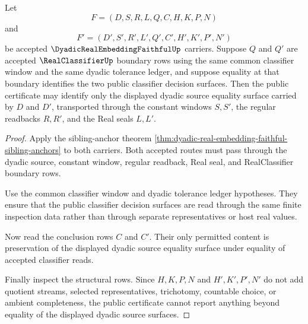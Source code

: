 \begin{theorem}
\label{thm:dyadic-real-embedding-faithful-public-certificate}
Let
$$
F=(D,S,R,L,Q,C,H,K,P,N)
$$
and
$$
F'=(D',S',R',L',Q',C',H',K',P',N')
$$
be accepted $\DyadicRealEmbeddingFaithfulUp$ carriers. Suppose $Q$ and $Q'$ are accepted $\RealClassifierUp$ boundary rows using the same common classifier window and the same dyadic tolerance ledger, and suppose equality at that boundary identifies the two public classifier decision surfaces. Then the public certificate may identify only the displayed dyadic source equality surface carried by $D$ and $D'$, transported through the constant windows $S,S'$, the regular readbacks $R,R'$, and the Real seals $L,L'$.
\end{theorem}
\begin{proof}
Apply the sibling-anchor theorem \autoref{thm:dyadic-real-embedding-faithful-sibling-anchors} to both carriers. Both accepted routes must pass through the dyadic source, constant window, regular readback, Real seal, and RealClassifier boundary rows.

Use the common classifier window and dyadic tolerance ledger hypotheses. They ensure that the public classifier decision surfaces are read through the same finite inspection data rather than through separate representatives or host real values.

Now read the conclusion rows $C$ and $C'$. Their only permitted content is preservation of the displayed dyadic source equality surface under equality of accepted classifier reads.

Finally inspect the structural rows. Since $H,K,P,N$ and $H',K',P',N'$ do not add quotient streams, selected representatives, trichotomy, countable choice, or ambient completeness, the public certificate cannot report anything beyond equality of the displayed dyadic source surfaces.
\end{proof}

